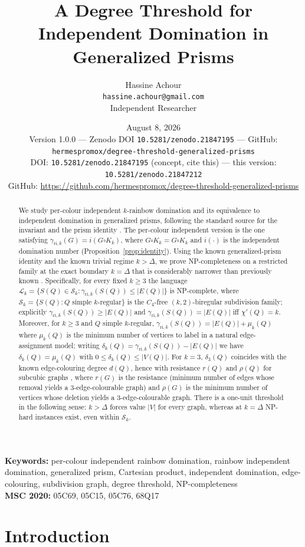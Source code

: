\documentclass[11pt,a4paper]{article}
\title{A Degree Threshold for Independent Domination in Generalized Prisms}
\author{Hassine Achour\\
\texttt{hassine.achour@gmail.com}\\
Independent Researcher}
\date{August 8, 2026\\[1ex]
\small Version 1.0.0 --- Zenodo DOI \texttt{10.5281/zenodo.21847195} --- GitHub: \texttt{hermespromox/degree-threshold-generalized-prisms}\\[0.4ex]
\small DOI: \texttt{10.5281/zenodo.21847195} (concept, cite this) --- this version: \texttt{10.5281/zenodo.21847212}\\
\small GitHub: \url{https://github.com/hermespromox/degree-threshold-generalized-prisms}}
\theoremstyle{plain}
\theoremstyle{definition}
\newcommand{\gri}{\gamma_{\mathrm{ri},k}}
\newcommand{\cardK}{\square K_k}
\newcommand{\cS}{\mathcal{S}}
\newcommand{\cL}{\mathcal{L}}
\begin{document}
\maketitle

\begin{abstract}
We study per-colour independent $k$-rainbow domination and its equivalence to independent domination in generalized prisms, following the standard source for the invariant and the prism identity \cite{KST2018}. The per-colour independent version is the one satisfying $\gri(G)=i(G\cardK)$, where $G\cardK=G\square K_{k}$ and $i(\cdot)$ is the independent domination number (Proposition~\ref{prop:identity}).
Using the known generalized-prism identity and the known trivial regime $k>\Delta$, we prove NP-completeness on a restricted family at the exact boundary $k=\Delta$ that is considerably narrower than previously known \cite{BK2019}.
Specifically, for every fixed $k\ge 3$ the language $\cL_{k}=\{S(Q)\in\cS_{k}:\gri(S(Q))\le |E(Q)|\}$ is NP-complete, where $\cS_{k}=\{S(Q):Q\text{ simple $k$-regular}\}$ is the $C_{4}$-free $(k,2)$-biregular subdivision family; explicitly $\gri(S(Q))\ge|E(Q)|$ and $\gri(S(Q))=|E(Q)|$ iff $\chi'(Q)=k$.
Moreover, for $k\ge 3$ and $Q$ simple $k$-regular, $\gri(S(Q))=|E(Q)|+\mu_{k}(Q)$ where $\mu_{k}(Q)$ is the minimum number of vertices to label in a natural edge-assignment model; writing $\delta_{k}(Q)=\gri(S(Q))-|E(Q)|$ we have $\delta_{k}(Q)=\mu_{k}(Q)$ with $0\le\delta_{k}(Q)\le|V(Q)|$.
For $k=3$, $\delta_{3}(Q)$ coincides with the known edge-colouring degree $d(Q)$, hence with resistance $r(Q)$ and $\rho(Q)$ for subcubic graphs \cite{FMS2022}, where $r(G)$ is the resistance (minimum number of edges whose removal yields a $3$-edge-colourable graph) and $\rho(G)$ is the minimum number of vertices whose deletion yields a $3$-edge-colourable graph.
There is a one-unit threshold in the following sense: $k>\Delta$ forces value $|V|$ for every graph, whereas at $k=\Delta$ NP-hard instances exist, even within $\cS_{k}$.
\end{abstract}

\noindent\textbf{Keywords:} per-colour independent rainbow domination, rainbow independent domination, generalized prism, Cartesian product, independent domination, edge-colouring, subdivision graph, degree threshold, NP-completeness\\
\textbf{MSC 2020:} 05C69, 05C15, 05C76, 68Q17

\section{Introduction}
\end{document}
